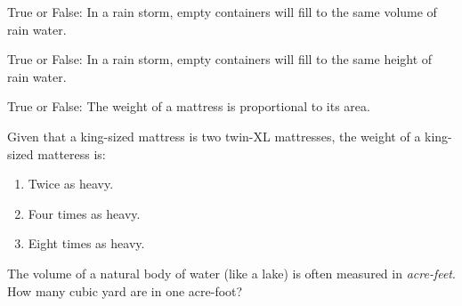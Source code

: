 \documentclass[noauthor,nooutcomes]{ximera}
\author{Bart Snapp}
\begin{document}
\maketitle


\begin{exercise}
  True or False: In a rain storm, empty containers will fill to the same volume of rain water.
\end{exercise}




\begin{exercise}
  True or False: In a rain storm, empty containers will fill to the same height of rain water.
\end{exercise}


\begin{exercise}
  True or False: The weight of a mattress is proportional to its area.
\end{exercise}



\begin{exercise}
  Given that a king-sized mattress is two twin-XL mattresses, the weight of a king-sized matteress is:
  \begin{enumerate}
  \item Twice as heavy.
  \item Four times as heavy.
  \item Eight times as heavy.
  \end{enumerate}
\end{exercise}


\begin{exercise}
  The volume of a natural body of water (like a lake)  is often measured in
  \textit{acre-feet}. How many cubic yard are in one acre-foot?
\end{exercise}







\end{document}
